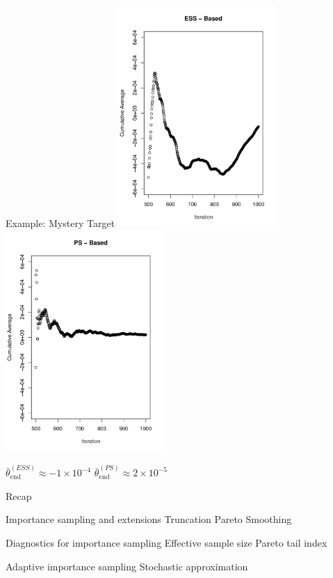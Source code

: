 \documentclass[14pt]{beamer}
\begin{document}
\begin{frame}{Example: Mystery Target}
    \centering
    \includegraphics[height=0.7\textheight, width=0.45\textwidth]{Figures/ESS mean traj.pdf}%
    \includegraphics[height=0.7\textheight, width=0.45\textwidth]{Figures/PS mean traj.pdf} \newline
    \begin{outline}
        $\bar{\theta}_\mathrm{end}^{(ESS)} \approx -1 \times 10^{-4}$ \hspace{1.5cm} $\bar{\theta}_\mathrm{end}^{(PS)} \approx 2 \times 10^{-5}$
    \end{outline}
\end{frame}


\begin{frame}{Recap}
    \begin{outline}
        \1 Importance sampling and extensions
            \2 Truncation
            \2 Pareto Smoothing \newline
        
        \1 Diagnostics for importance sampling
            \2 Effective sample size
            \2 Pareto tail index \newline

        \1 Adaptive importance sampling
            \2 Stochastic approximation
    \end{outline}
\end{frame}
\end{document}
